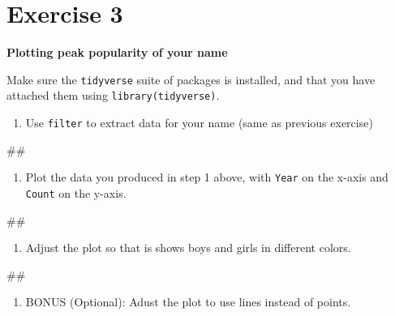 \documentclass[]{book}
\newenvironment{Shaded}{\begin{snugshade}}{\end{snugshade}}
\newcommand{\NormalTok}[1]{#1}
\providecommand{\tightlist}{%
  \setlength{\itemsep}{0pt}\setlength{\parskip}{0pt}}
\begin{document}
\section{Exercise 3}\label{exercise-3}

\textbf{Plotting peak popularity of your name}

Make sure the \texttt{tidyverse} suite of packages is installed, and
that you have attached them using \texttt{library(tidyverse)}.

\begin{enumerate}
\def\labelenumi{\arabic{enumi}.}
\tightlist
\item
  Use \texttt{filter} to extract data for your name (same as previous
  exercise)
\end{enumerate}

\begin{Shaded}
\begin{Highlighting}[]
\NormalTok{##}
\end{Highlighting}
\end{Shaded}

\begin{enumerate}
\def\labelenumi{\arabic{enumi}.}
\setcounter{enumi}{1}
\tightlist
\item
  Plot the data you produced in step 1 above, with \texttt{Year} on the
  x-axis and \texttt{Count} on the y-axis.
\end{enumerate}

\begin{Shaded}
\begin{Highlighting}[]
\NormalTok{##}
\end{Highlighting}
\end{Shaded}

\begin{enumerate}
\def\labelenumi{\arabic{enumi}.}
\setcounter{enumi}{2}
\tightlist
\item
  Adjust the plot so that is shows boys and girls in different colors.
\end{enumerate}

\begin{Shaded}
\begin{Highlighting}[]
\NormalTok{##}
\end{Highlighting}
\end{Shaded}

\begin{enumerate}
\def\labelenumi{\arabic{enumi}.}
\setcounter{enumi}{3}
\tightlist
\item
  BONUS (Optional): Adust the plot to use lines instead of points.
\end{enumerate}
\end{document}
